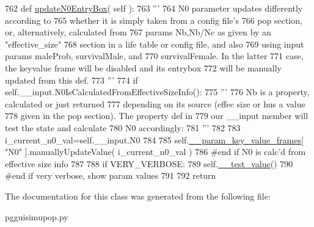 \begin{DoxyCode}
762     \textcolor{keyword}{def }\hyperlink{classnegui_1_1pgguisimupop_1_1PGGuiSimuPop_ac193cf44f5e4f1e5b146a43e9563d7b0}{updateN0EntryBox}( self ):
763         \textcolor{stringliteral}{'''}
764 \textcolor{stringliteral}{        N0 parameter updates differently according to}
765 \textcolor{stringliteral}{        whether it is simply taken from a config file's}
766 \textcolor{stringliteral}{        pop section, or, alternatively, calculated from}
767 \textcolor{stringliteral}{        params Nb,Nb/Nc as given by an "effective\_size"}
768 \textcolor{stringliteral}{        section in a life table or config file, and also}
769 \textcolor{stringliteral}{        using input params maleProb, survivalMale, and}
770 \textcolor{stringliteral}{        survivalFemale.  In the latter}
771 \textcolor{stringliteral}{        case, the keyvalue frame will be disabled and its entrybox}
772 \textcolor{stringliteral}{        will be manually updated from this def.  }
773 \textcolor{stringliteral}{        '''}
774         \textcolor{keywordflow}{if} self.\_\_input.N0IsCalculatedFromEffectiveSizeInfo():
775             \textcolor{stringliteral}{'''}
776 \textcolor{stringliteral}{            Nb is a property, calculated or just returned}
777 \textcolor{stringliteral}{            depending on its source (effec size or hus a value}
778 \textcolor{stringliteral}{            given in the pop section). The property def in}
779 \textcolor{stringliteral}{            our \_\_input member will test the state and calculate}
780 \textcolor{stringliteral}{            N0 accordingly:}
781 \textcolor{stringliteral}{            '''}
782 
783             i\_current\_n0\_val=self.\_\_input.N0
784 
785             self.\hyperlink{classnegui_1_1pgguisimupop_1_1PGGuiSimuPop_a272523ce4bad4d1073c506e858c59996}{\_\_param\_key\_value\_frames}[ \textcolor{stringliteral}{"N0"} ].manuallyUpdateValue( 
      i\_current\_n0\_val )
786         \textcolor{comment}{#end if N0 is calc'd from effective size info}
787 
788         \textcolor{keywordflow}{if} VERY\_VERBOSE:
789             self.\hyperlink{classnegui_1_1pgguisimupop_1_1PGGuiSimuPop_a1a916d4c19afe08b2c7772d099c71f3f}{\_\_test\_value}()
790         \textcolor{comment}{#end if very verbose, show param values}
791 
792         \textcolor{keywordflow}{return}
\end{DoxyCode}


The documentation for this class was generated from the following file\+:\begin{DoxyCompactItemize}
\item 
pgguisimupop.\+py\end{DoxyCompactItemize}
